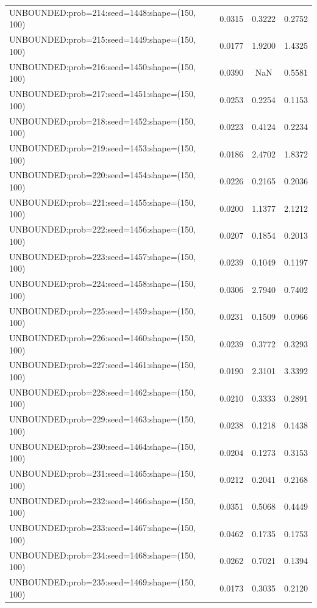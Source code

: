 \begin{longtable}{lccc}
UNBOUNDED:prob=214:seed=1448:shape=(150, 100) &   0.0315 &  0.3222 &  0.2752 \\
UNBOUNDED:prob=215:seed=1449:shape=(150, 100) &   0.0177 &  1.9200 &  1.4325 \\
UNBOUNDED:prob=216:seed=1450:shape=(150, 100) &   0.0390 &     NaN &  0.5581 \\
UNBOUNDED:prob=217:seed=1451:shape=(150, 100) &   0.0253 &  0.2254 &  0.1153 \\
UNBOUNDED:prob=218:seed=1452:shape=(150, 100) &   0.0223 &  0.4124 &  0.2234 \\
UNBOUNDED:prob=219:seed=1453:shape=(150, 100) &   0.0186 &  2.4702 &  1.8372 \\
UNBOUNDED:prob=220:seed=1454:shape=(150, 100) &   0.0226 &  0.2165 &  0.2036 \\
UNBOUNDED:prob=221:seed=1455:shape=(150, 100) &   0.0200 &  1.1377 &  2.1212 \\
UNBOUNDED:prob=222:seed=1456:shape=(150, 100) &   0.0207 &  0.1854 &  0.2013 \\
UNBOUNDED:prob=223:seed=1457:shape=(150, 100) &   0.0239 &  0.1049 &  0.1197 \\
UNBOUNDED:prob=224:seed=1458:shape=(150, 100) &   0.0306 &  2.7940 &  0.7402 \\
UNBOUNDED:prob=225:seed=1459:shape=(150, 100) &   0.0231 &  0.1509 &  0.0966 \\
UNBOUNDED:prob=226:seed=1460:shape=(150, 100) &   0.0239 &  0.3772 &  0.3293 \\
UNBOUNDED:prob=227:seed=1461:shape=(150, 100) &   0.0190 &  2.3101 &  3.3392 \\
UNBOUNDED:prob=228:seed=1462:shape=(150, 100) &   0.0210 &  0.3333 &  0.2891 \\
UNBOUNDED:prob=229:seed=1463:shape=(150, 100) &   0.0238 &  0.1218 &  0.1438 \\
UNBOUNDED:prob=230:seed=1464:shape=(150, 100) &   0.0204 &  0.1273 &  0.3153 \\
UNBOUNDED:prob=231:seed=1465:shape=(150, 100) &   0.0212 &  0.2041 &  0.2168 \\
UNBOUNDED:prob=232:seed=1466:shape=(150, 100) &   0.0351 &  0.5068 &  0.4449 \\
UNBOUNDED:prob=233:seed=1467:shape=(150, 100) &   0.0462 &  0.1735 &  0.1753 \\
UNBOUNDED:prob=234:seed=1468:shape=(150, 100) &   0.0262 &  0.7021 &  0.1394 \\
UNBOUNDED:prob=235:seed=1469:shape=(150, 100) &   0.0173 &  0.3035 &  0.2120 \\

\end{longtable}
